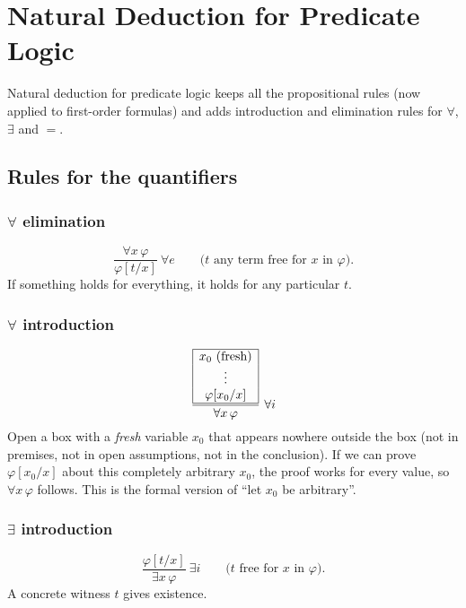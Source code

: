 \chapter{Natural Deduction for Predicate Logic}\label{ch:preddeduction}

Natural deduction for predicate logic keeps all the propositional rules (now applied to
first-order formulas) and adds introduction and elimination rules for $\forall$, $\exists$
and $=$.

\section{Rules for the quantifiers}

\subsection{\texorpdfstring{$\forall$}{for all} elimination}
\[
  \dfrac{\forall x\,\varphi}{\varphi[t/x]}\ \forall e
  \qquad\text{($t$ any term free for $x$ in $\varphi$).}
\]
If something holds for everything, it holds for any particular $t$.

\subsection{\texorpdfstring{$\forall$}{for all} introduction}
\[
  \dfrac{\begin{array}{|c|}\hline x_0\ \text{(fresh)}\\ \vdots\\ \varphi[x_0/x]\\\hline\end{array}}
  {\forall x\,\varphi}\ \forall i
\]
Open a box with a \emph{fresh} variable $x_0$ that appears nowhere outside the box (not in
premises, not in open assumptions, not in the conclusion). If we can prove
$\varphi[x_0/x]$ about this completely arbitrary $x_0$, the proof works for every value,
so $\forall x\,\varphi$ follows. This is the formal version of ``let $x_0$ be arbitrary''.

\subsection{\texorpdfstring{$\exists$}{exists} introduction}
\[
  \dfrac{\varphi[t/x]}{\exists x\,\varphi}\ \exists i
  \qquad\text{($t$ free for $x$ in $\varphi$).}
\]
A concrete witness $t$ gives existence.

